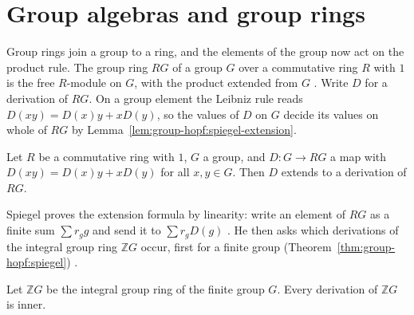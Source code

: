 \section{Group algebras and group rings}\label{sec:group-hopf:group-algebras}

Group rings join a group to a ring, and the elements of the group now act on the
product rule. %
The group ring $RG$ of a group $G$ over a commutative ring $R$ with
$1$ is the free $R$-module on $G$, with the product extended from $G$
\cite[p.~2956]{Spiegel1994}. Write $D$ for a derivation of $RG$. On a group
element the Leibniz rule reads $D(xy)=D(x)y+xD(y)$, so the values of $D$ on $G$
decide its values on whole of $RG$ by Lemma~\ref{lem:group-hopf:spiegel-extension}.

\begin{lemma}\label{lem:group-hopf:spiegel-extension}
Let $R$ be a commutative ring with $1$, $G$ a group, and $D\colon G\to RG$ a map with
$D(xy)=D(x)y+xD(y)$ for all $x,y\in G$. Then $D$ extends to a derivation of $RG$.
\end{lemma}

Spiegel proves the extension formula by linearity: write an element of $RG$ as a
finite sum $\sum r_g g$ and send it to $\sum r_g D(g)$ \cite[p.~2956]{Spiegel1994}.
He then asks which derivations of the integral group ring $\mathbb{Z}G$ occur, first
for a finite group (Theorem~\ref{thm:group-hopf:spiegel}) \cite[p.~2955]{Spiegel1994}.

\begin{theorem}\label{thm:group-hopf:spiegel}
Let $\mathbb{Z}G$ be the integral group ring of the finite group $G$. Every
derivation of $\mathbb{Z}G$ is inner.
\end{theorem}

